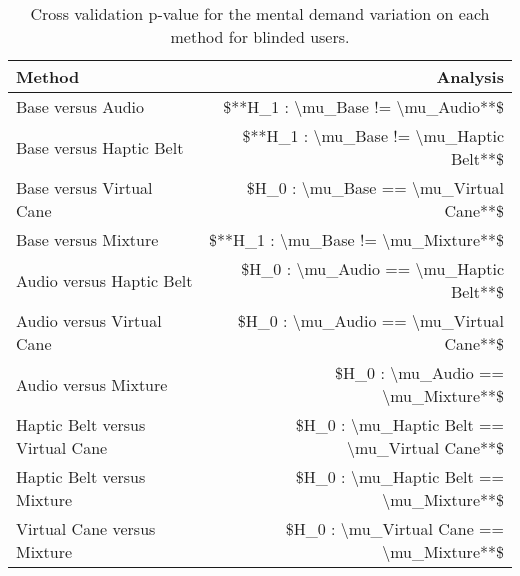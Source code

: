 
\begin{table}[!htb]
\centering
\caption{Cross validation p-value for the mental demand variation on each method for blinded users.}
\label{tab:lsd_mental_demand_var}
\begin{tabular}{lr}
\toprule
                         Method &                                      Analysis \\
\midrule
              Base versus Audio &             \$**H\_1 : \textbackslash mu\_Base != \textbackslash mu\_Audio**\$ \\
        Base versus Haptic Belt &       \$**H\_1 : \textbackslash mu\_Base != \textbackslash mu\_Haptic Belt**\$ \\
       Base versus Virtual Cane &        \$H\_0 : \textbackslash mu\_Base == \textbackslash mu\_Virtual Cane**\$ \\
            Base versus Mixture &           \$**H\_1 : \textbackslash mu\_Base != \textbackslash mu\_Mixture**\$ \\
       Audio versus Haptic Belt &        \$H\_0 : \textbackslash mu\_Audio == \textbackslash mu\_Haptic Belt**\$ \\
      Audio versus Virtual Cane &       \$H\_0 : \textbackslash mu\_Audio == \textbackslash mu\_Virtual Cane**\$ \\
           Audio versus Mixture &            \$H\_0 : \textbackslash mu\_Audio == \textbackslash mu\_Mixture**\$ \\
Haptic Belt versus Virtual Cane & \$H\_0 : \textbackslash mu\_Haptic Belt == \textbackslash mu\_Virtual Cane**\$ \\
     Haptic Belt versus Mixture &      \$H\_0 : \textbackslash mu\_Haptic Belt == \textbackslash mu\_Mixture**\$ \\
    Virtual Cane versus Mixture &     \$H\_0 : \textbackslash mu\_Virtual Cane == \textbackslash mu\_Mixture**\$ \\
\bottomrule
\end{tabular}
\end{table}

